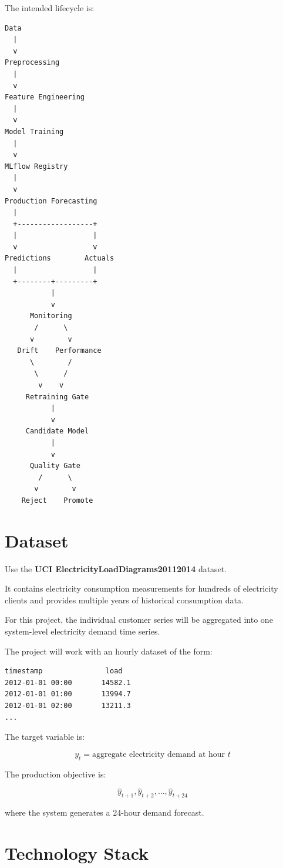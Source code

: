 \documentclass[11pt,a4paper]{article}
\begin{document}
The intended lifecycle is:

\begin{verbatim}
Data
  |
  v
Preprocessing
  |
  v
Feature Engineering
  |
  v
Model Training
  |
  v
MLflow Registry
  |
  v
Production Forecasting
  |
  +------------------+
  |                  |
  v                  v
Predictions        Actuals
  |                  |
  +--------+---------+
           |
           v
      Monitoring
       /      \
      v        v
   Drift    Performance
      \        /
       \      /
        v    v
     Retraining Gate
           |
           v
     Candidate Model
           |
           v
      Quality Gate
        /      \
       v        v
    Reject    Promote
\end{verbatim}

\section{Dataset}

Use the \textbf{UCI ElectricityLoadDiagrams20112014} dataset.

It contains electricity consumption measurements for hundreds of electricity clients and provides multiple years of historical consumption data.

For this project, the individual customer series will be aggregated into one system-level electricity demand time series.

The project will work with an hourly dataset of the form:

\begin{lstlisting}
timestamp               load
2012-01-01 00:00       14582.1
2012-01-01 01:00       13994.7
2012-01-01 02:00       13211.3
...
\end{lstlisting}

The target variable is:

\[
y_t = \text{aggregate electricity demand at hour } t
\]

The production objective is:

\[
\hat{y}_{t+1}, \hat{y}_{t+2}, \dots, \hat{y}_{t+24}
\]

where the system generates a 24-hour demand forecast.

\section{Technology Stack}
\end{document}
